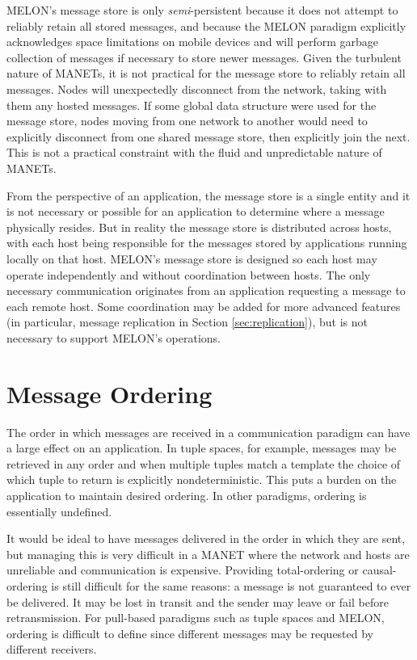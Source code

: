 MELON's message store is only \textit{semi}-persistent because it does not attempt to reliably retain all stored messages, and because the MELON paradigm explicitly acknowledges space limitations on mobile devices and will perform garbage collection of messages if necessary to store newer messages. Given the turbulent nature of MANETs, it is not practical for the message store to reliably retain all messages. Nodes will unexpectedly disconnect from the network, taking with them any hosted messages. If some global data structure were used for the message store, nodes moving from one network to another would need to explicitly disconnect from one shared message store, then explicitly join the next. This is not a practical constraint with the fluid and unpredictable nature of MANETs.

From the perspective of an application, the message store is a single entity and it is not necessary or possible for an application to determine where a message physically resides. But in reality the message store is distributed across hosts, with each host being responsible for the messages stored by applications running locally on that host. MELON's message store is designed so each host may operate independently and without coordination between hosts. The only necessary communication originates from an application requesting a message to each remote host. Some coordination may be added for more advanced features (in particular, message replication in Section \ref{sec:replication}), but is not necessary to support MELON's operations.

\section{Message Ordering}

The order in which messages are received in a communication paradigm can have a large effect on an application. In tuple spaces, for example, messages may be retrieved in any order and when multiple tuples match a template the choice of which tuple to return is explicitly nondeterministic. This puts a burden on the application to maintain desired ordering. In other paradigms, ordering is essentially undefined. 

It would be ideal to have messages delivered in the order in which they are sent, but managing this is very difficult in a MANET where the network and hosts are unreliable and communication is expensive. Providing total-ordering or causal-ordering is still difficult for the same reasons: a message is not guaranteed to ever be delivered. It may be lost in transit and the sender may leave or fail before retransmission.  For pull-based paradigms such as tuple spaces and MELON, ordering is difficult to define since different messages may be requested by different receivers.

